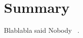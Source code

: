 \documentclass[letterpaper,12pt]{article}
\begin{document}
\section{Summary}


Blablabla said Nobody ~\cite{Nobody06}.

{}

\end{document}
